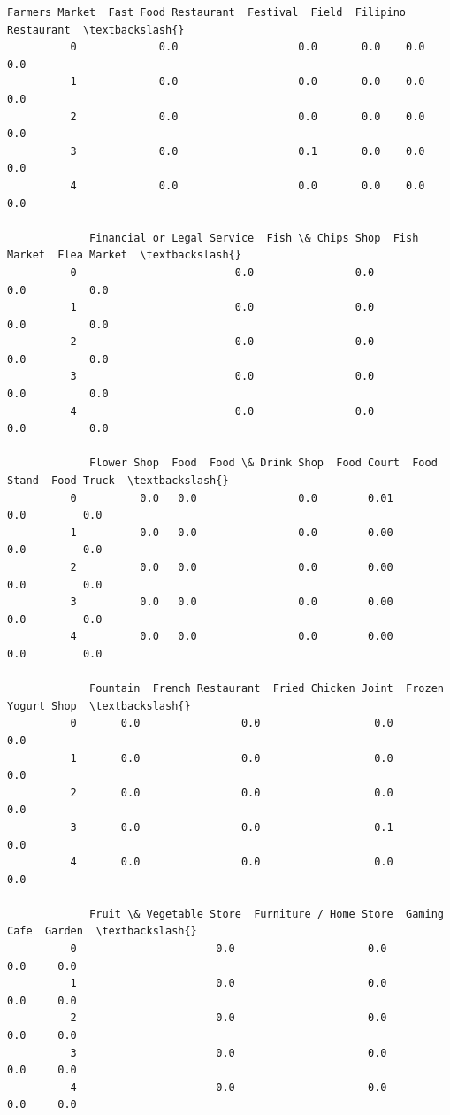 \documentclass[11pt]{article}
\begin{document}
\begin{Verbatim}[commandchars=\\\{\}]
             Farmers Market  Fast Food Restaurant  Festival  Field  Filipino Restaurant  \textbackslash{}
          0             0.0                   0.0       0.0    0.0                  0.0   
          1             0.0                   0.0       0.0    0.0                  0.0   
          2             0.0                   0.0       0.0    0.0                  0.0   
          3             0.0                   0.1       0.0    0.0                  0.0   
          4             0.0                   0.0       0.0    0.0                  0.0   
          
             Financial or Legal Service  Fish \& Chips Shop  Fish Market  Flea Market  \textbackslash{}
          0                         0.0                0.0          0.0          0.0   
          1                         0.0                0.0          0.0          0.0   
          2                         0.0                0.0          0.0          0.0   
          3                         0.0                0.0          0.0          0.0   
          4                         0.0                0.0          0.0          0.0   
          
             Flower Shop  Food  Food \& Drink Shop  Food Court  Food Stand  Food Truck  \textbackslash{}
          0          0.0   0.0                0.0        0.01         0.0         0.0   
          1          0.0   0.0                0.0        0.00         0.0         0.0   
          2          0.0   0.0                0.0        0.00         0.0         0.0   
          3          0.0   0.0                0.0        0.00         0.0         0.0   
          4          0.0   0.0                0.0        0.00         0.0         0.0   
          
             Fountain  French Restaurant  Fried Chicken Joint  Frozen Yogurt Shop  \textbackslash{}
          0       0.0                0.0                  0.0                 0.0   
          1       0.0                0.0                  0.0                 0.0   
          2       0.0                0.0                  0.0                 0.0   
          3       0.0                0.0                  0.1                 0.0   
          4       0.0                0.0                  0.0                 0.0   
          
             Fruit \& Vegetable Store  Furniture / Home Store  Gaming Cafe  Garden  \textbackslash{}
          0                      0.0                     0.0          0.0     0.0   
          1                      0.0                     0.0          0.0     0.0   
          2                      0.0                     0.0          0.0     0.0   
          3                      0.0                     0.0          0.0     0.0   
          4                      0.0                     0.0          0.0     0.0   
          

\end{Verbatim}
\end{document}
